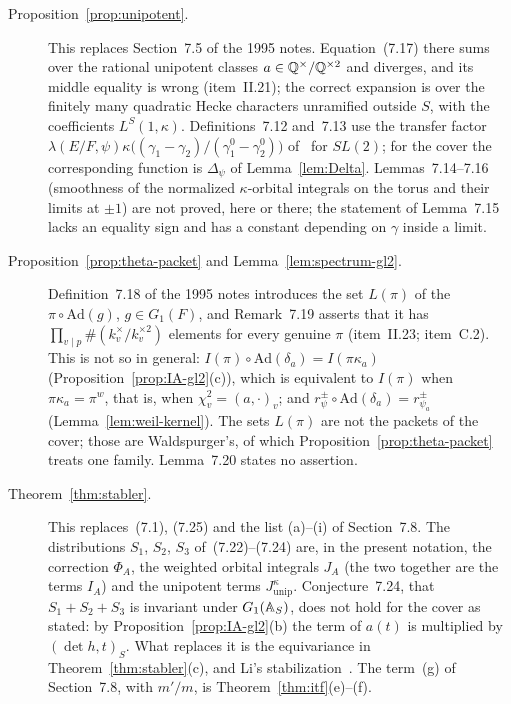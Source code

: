 \begin{description}
\item[Proposition~\ref{prop:unipotent}.] This replaces Section~7.5 of the 1995 notes. Equation~(7.17) there sums over the rational unipotent classes $a\in\mathbb{Q}^\times/\mathbb{Q}^{\times2}$ and diverges, and its middle equality is wrong (item~II.21); the correct expansion is over the finitely many quadratic Hecke characters unramified outside $S$, with the coefficients $L^S(1,\kappa)$. Definitions~7.12 and~7.13 use the transfer factor $\lambda(E/F,\psi)\kappa\bigl((\gamma_1-\gamma_2)/(\gamma_1^0-\gamma_2^0)\bigr)$ of~\cite{LL} for $SL(2)$; for the cover the corresponding function is $\Delta_\psi$ of Lemma~\ref{lem:Delta}. Lemmas~7.14--7.16 (smoothness of the normalized $\kappa$-orbital integrals on the torus and their limits at $\pm1$) are not proved, here or there; the statement of Lemma~7.15 lacks an equality sign and has a constant depending on $\gamma$ inside a limit.

\item[Proposition~\ref{prop:theta-packet} and Lemma~\ref{lem:spectrum-gl2}.] Definition~7.18 of the 1995 notes introduces the set $L(\pi)$ of the $\pi\circ\mathrm{Ad}(g)$, $g\in G_1(F)$, and Remark~7.19 asserts that it has $\prod_{v\mid p}\#(k_v^\times/k_v^{\times2})$ elements for every genuine $\pi$ (item~II.23; item~C.2). This is not so in general: $I(\pi)\circ\mathrm{Ad}(\delta_a)=I(\pi\kappa_a)$ (Proposition~\ref{prop:IA-gl2}(c)), which is equivalent to $I(\pi)$ when $\pi\kappa_a=\pi^w$, that is, when $\chi_v^2=(a,\cdot)_v$; and $r^\pm_{\psi}\circ\mathrm{Ad}(\delta_a)=r^\pm_{\psi_a}$ (Lemma~\ref{lem:weil-kernel}). The sets $L(\pi)$ are not the packets of the cover; those are Waldspurger's, of which Proposition~\ref{prop:theta-packet} treats one family. Lemma~7.20 states no assertion.

\item[Theorem~\ref{thm:stabler}.] This replaces~(7.1), (7.25) and the list (a)--(i) of Section~7.8. The distributions $S_1$, $S_2$, $S_3$ of~(7.22)--(7.24) are, in the present notation, the correction $\Phi_A$, the weighted orbital integrals $J_A$ (the two together are the terms $I_A$) and the unipotent terms $J^\kappa_{\mathrm{unip}}$. Conjecture~7.24, that $S_1+S_2+S_3$ is invariant under $G_1(\mathbb{A}_S)$, does not hold for the cover as stated: by Proposition~\ref{prop:IA-gl2}(b) the term of $a(t)$ is multiplied by $(\det h,t)_S$. What replaces it is the equivariance in Theorem~\ref{thm:stabler}(c), and Li's stabilization~\cite{Li21}. The term~(g) of Section~7.8, with $m'/m$, is Theorem~\ref{thm:itf}(e)--(f).


\end{description}
